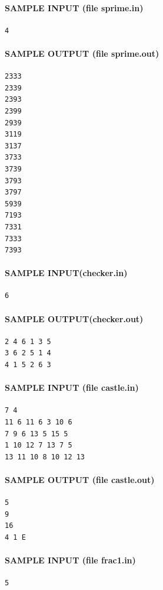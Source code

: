 \documentclass[11pt]{article}
\begin{document}
\paragraph{SAMPLE INPUT (file sprime.in)}
\begin{verbatim}
4
\end{verbatim}

\paragraph{SAMPLE OUTPUT (file sprime.out)}
\begin{verbatim}
2333
2339
2393
2399
2939
3119
3137
3733
3739
3793
3797
5939
7193
7331
7333
7393
\end{verbatim}

\paragraph{SAMPLE INPUT(checker.in)}
\begin{verbatim}
6
\end{verbatim}

\paragraph{SAMPLE OUTPUT(checker.out)}
\begin{verbatim}
2 4 6 1 3 5
3 6 2 5 1 4
4 1 5 2 6 3
\end{verbatim}

\paragraph{SAMPLE INPUT (file castle.in)}
\begin{verbatim}
7 4
11 6 11 6 3 10 6
7 9 6 13 5 15 5
1 10 12 7 13 7 5
13 11 10 8 10 12 13
\end{verbatim}

\paragraph{SAMPLE OUTPUT (file castle.out)}
\begin{verbatim}
5
9
16
4 1 E
\end{verbatim}

\paragraph{SAMPLE INPUT (file frac1.in)}
\begin{verbatim}
5
\end{verbatim}
\end{document}
